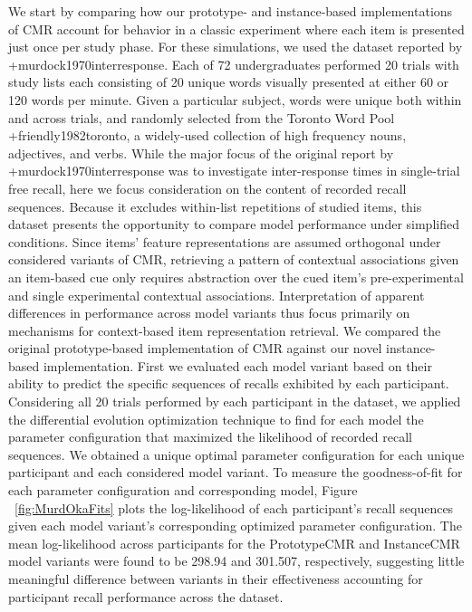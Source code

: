 \markdownRendererInterblockSeparator
{}We start by comparing how our prototype- and instance-based implementations of CMR account for behavior in a classic experiment where each item is presented just once per study phase. For these simulations, we used the dataset reported by +{}{}{murdock1970interresponse}. Each of 72 undergraduates performed 20 trials with study lists each consisting of 20 unique words visually presented at either 60 or 120 words per minute. Given a particular subject, words were unique both within and across trials, and randomly selected from the Toronto Word Pool +{}{}{friendly1982toronto}, a widely-used collection of high frequency nouns, adjectives, and verbs.\markdownRendererInterblockSeparator
{}While the major focus of the original report by +{}{}{murdock1970interresponse} was to investigate inter-response times in single-trial free recall, here we focus consideration on the content of recorded recall sequences. Because it excludes within-list repetitions of studied items, this dataset presents the opportunity to compare model performance under simplified conditions. Since items' feature representations are assumed orthogonal under considered variants of CMR, retrieving a pattern of contextual associations given an item-based cue only requires abstraction over the cued item's pre-experimental and single experimental contextual associations. Interpretation of apparent differences in performance across model variants thus focus primarily on mechanisms for context-based item representation retrieval.\markdownRendererInterblockSeparator
{}We compared the original prototype-based implementation of CMR against our novel instance-based implementation. First we evaluated each model variant based on their ability to predict the specific sequences of recalls exhibited by each participant. Considering all 20 trials performed by each participant in the dataset, we applied the differential evolution optimization technique to find for each model the parameter configuration that maximized the likelihood of recorded recall sequences. We obtained a unique optimal parameter configuration for each unique participant and each considered model variant. To measure the goodness-of-fit for each parameter configuration and corresponding model, Figure ~\ref{fig:MurdOkaFits} plots the log-likelihood of each participant's recall sequences given each model variant's corresponding optimized parameter configuration. The mean log-likelihood across participants for the PrototypeCMR and InstanceCMR model variants were found to be 298.94 and 301.507, respectively, suggesting little meaningful difference between variants in their effectiveness accounting for participant recall performance across the dataset.\markdownRendererInterblockSeparator

